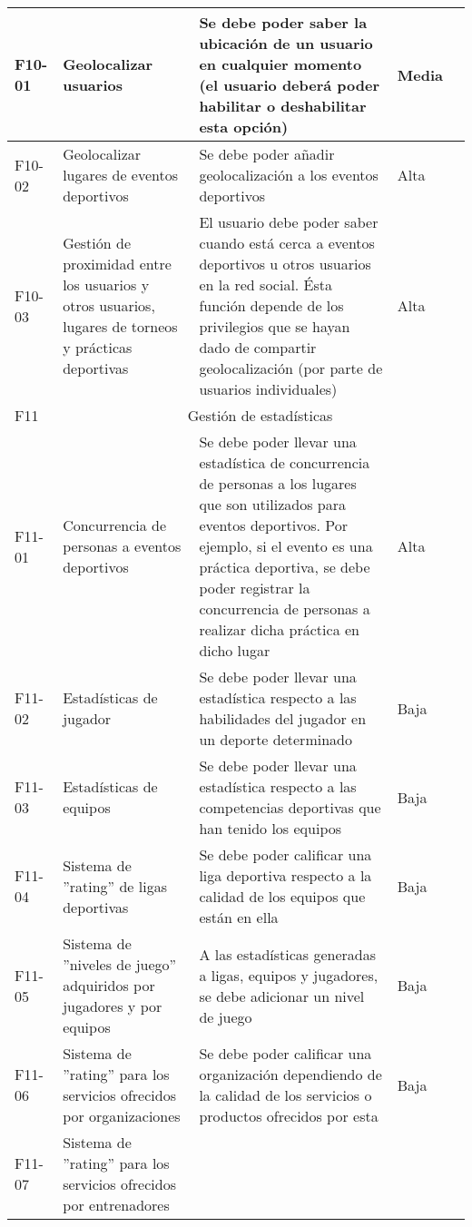 \begin{center}
\begin{longtable}{|p{1.5cm}|p{3cm}|p{5cm}|p{2cm}|p{3cm}|}
			F10-01 & 
			Geolocalizar usuarios & 
			Se debe poder saber la ubicación de un usuario en cualquier momento (el usuario deberá poder habilitar o deshabilitar esta opción) &
			Media & 
			\\
			\hline
			F10-02 & 
			Geolocalizar lugares de eventos deportivos & 
			Se debe poder añadir geolocalización a los eventos deportivos &
			Alta & 
			\\
			\hline
			F10-03 & 
			Gestión de proximidad entre los usuarios y otros usuarios, lugares de torneos y prácticas deportivas & 
			El usuario debe poder saber cuando está cerca a eventos deportivos u otros usuarios
en la red social. Ésta función depende de los privilegios que se hayan dado de compartir geolocalización (por parte de usuarios individuales) &
			Alta & 
			\\
			\hline
			F11 & 
			\multicolumn{4}{c|}{Gestión de estadísticas} \\
			\hline
			F11-01 & 
			Concurrencia de personas a eventos deportivos & 
			Se debe poder llevar una estadística de concurrencia de personas a los lugares que  son utilizados para eventos deportivos. Por ejemplo, si el evento es una práctica deportiva, se debe poder registrar la concurrencia de personas a realizar dicha práctica en dicho lugar &
			Alta & 
			\\
			\hline
			F11-02 & 
			Estadísticas de jugador & 
			Se debe poder llevar una estadística respecto a las habilidades del jugador en un
deporte determinado &
			Baja & 
			\\
			F11-03 & 
			Estadísticas de equipos & 
			Se debe poder llevar una estadística respecto a las competencias deportivas que
han tenido los equipos &
			Baja & 
			\\
			\hline
			F11-04 & 
			Sistema de ''rating'' de ligas deportivas & 
			Se debe poder calificar una liga deportiva respecto a la calidad de los equipos que están en ella &
			Baja & 
			\\
			\hline
			F11-05 & 
			Sistema de ''niveles de juego'' adquiridos por jugadores y por equipos & 
			A las estadísticas generadas a ligas, equipos y jugadores, se debe adicionar un nivel de juego &
			Baja & 
			\\
			\hline
			F11-06 & 
			Sistema de ''rating'' para los servicios ofrecidos por organizaciones & 
			Se debe poder calificar una organización dependiendo de la calidad de los servicios o productos ofrecidos por esta &
			Baja & 
			\\
			\hline
			F11-07 & 
			Sistema de ''rating'' para los servicios ofrecidos por entrenadores & 

\end{longtable}
\end{center}
